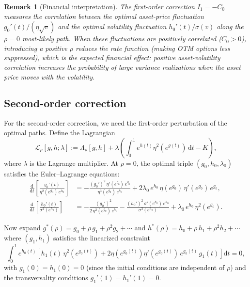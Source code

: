 \documentclass[11pt]{article}
\newtheorem{remark}[theorem]{Remark}
\theoremstyle{definition}
\newcommand{\dd}{\mathrm{d}}
\begin{document}
\begin{remark}[Financial interpretation]\label{rem:interp}
The first-order correction $I_1 = -C_0$ measures the correlation between the optimal asset-price fluctuation $g_0'(t)/(\eta \sqrt{v})$ and the optimal volatility fluctuation $h_0'(t)/\sigma(v)$ along the $\rho = 0$ most-likely path. When these fluctuations are positively correlated ($C_0 > 0$), introducing a positive $\rho$ reduces the rate function (making OTM options less suppressed), which is the expected financial effect: positive asset-volatility correlation increases the probability of large variance realizations when the asset price moves with the volatility.
\end{remark}

\subsection{Second-order correction}\label{sec:second_order}

For the second-order correction, we need the first-order perturbation of the optimal paths. Define the Lagrangian
\begin{equation}\label{eq:Lagrangian}
  \mathcal{L}_\rho[g,h;\lambda] := \Lambda_\rho[g,h] + \lambda\left(\int_0^1 e^{h(t)}\eta^2(e^{g(t)})\,\dd t - K\right),
\end{equation}
where $\lambda$ is the Lagrange multiplier. At $\rho = 0$, the optimal triple $(g_0, h_0, \lambda_0)$ satisfies the Euler--Lagrange equations:
\begin{align}
  \frac{\dd}{\dd t}\!\left[\frac{g_0'(t)}{\eta^2(e^{g_0})\,e^{h_0}}\right] &= -\frac{(g_0')^2\,\eta'(e^{g_0})\,e^{g_0}}{\eta^3(e^{g_0})\,e^{h_0}} + 2\lambda_0\,e^{h_0}\,\eta(e^{g_0})\,\eta'(e^{g_0})\,e^{g_0}, \label{eq:EL_g0}\\
  \frac{\dd}{\dd t}\!\left[\frac{h_0'(t)}{\sigma^2(e^{h_0})}\right] &= -\frac{(g_0')^2}{2\,\eta^2(e^{g_0})\,e^{h_0}} - \frac{(h_0')^2\,\sigma'(e^{h_0})\,e^{h_0}}{\sigma^3(e^{h_0})} + \lambda_0\,e^{h_0}\,\eta^2(e^{g_0}). \label{eq:EL_h0}
\end{align}

Now expand $g^*(\rho) = g_0 + \rho\,g_1 + \rho^2 g_2 + \cdots$ and $h^*(\rho) = h_0 + \rho\,h_1 + \rho^2 h_2 + \cdots$ where $(g_1, h_1)$ satisfies the linearized constraint
\begin{equation}\label{eq:lin_constraint}
  \int_0^1 e^{h_0(t)}\!\left[h_1(t)\,\eta^2(e^{g_0(t)}) + 2\eta(e^{g_0(t)})\eta'(e^{g_0(t)})\,e^{g_0(t)}\,g_1(t)\right]\dd t = 0,
\end{equation}
with $g_1(0) = h_1(0) = 0$ (since the initial conditions are independent of $\rho$) and the transversality conditions $g_1'(1) = h_1'(1) = 0$.
\end{document}
